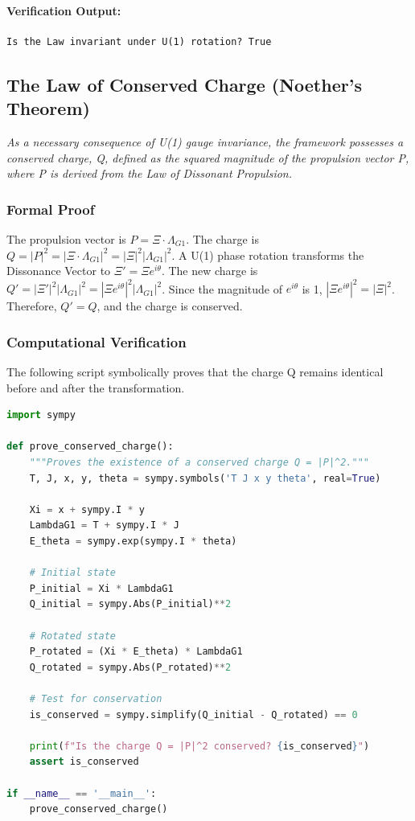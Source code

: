 \paragraph{Verification Output:}
\begin{verbatim}
Is the Law invariant under U(1) rotation? True
\end{verbatim}

\subsection{The Law of Conserved Charge (Noether's Theorem)}
\textit{As a necessary consequence of U(1) gauge invariance, the framework possesses a conserved charge, Q, defined as the squared magnitude of the propulsion vector P, where P is derived from the Law of Dissonant Propulsion.}

\subsubsection*{Formal Proof}
The propulsion vector is $P = \Xi \cdot \Lambda_{G1}$. The charge is $Q = |P|^2 = |\Xi \cdot \Lambda_{G1}|^2 = |\Xi|^2 |\Lambda_{G1}|^2$. A U(1) phase rotation transforms the Dissonance Vector to $\Xi' = \Xi e^{i\theta}$. The new charge is $Q' = |\Xi'|^2 |\Lambda_{G1}|^2 = |\Xi e^{i\theta}|^2 |\Lambda_{G1}|^2$. Since the magnitude of $e^{i\theta}$ is 1, $|\Xi e^{i\theta}|^2 = |\Xi|^2$. Therefore, $Q' = Q$, and the charge is conserved.

\subsubsection*{Computational Verification}
The following script symbolically proves that the charge Q remains identical before and after the transformation.
\begin{lstlisting}[language=Python, caption={Symbolic proof of a conserved Noether charge.}]
import sympy

def prove_conserved_charge():
    """Proves the existence of a conserved charge Q = |P|^2."""
    T, J, x, y, theta = sympy.symbols('T J x y theta', real=True)
    
    Xi = x + sympy.I * y
    LambdaG1 = T + sympy.I * J
    E_theta = sympy.exp(sympy.I * theta)
    
    # Initial state
    P_initial = Xi * LambdaG1
    Q_initial = sympy.Abs(P_initial)**2
    
    # Rotated state
    P_rotated = (Xi * E_theta) * LambdaG1
    Q_rotated = sympy.Abs(P_rotated)**2
    
    # Test for conservation
    is_conserved = sympy.simplify(Q_initial - Q_rotated) == 0
    
    print(f"Is the charge Q = |P|^2 conserved? {is_conserved}")
    assert is_conserved

if __name__ == '__main__':
    prove_conserved_charge()
\end{lstlisting}
